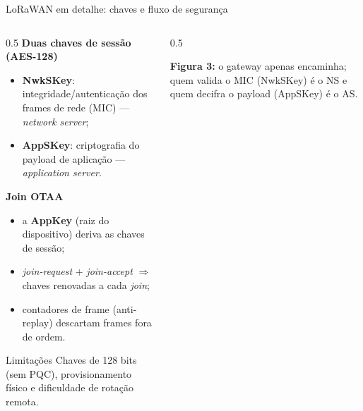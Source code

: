 \documentclass[aspectratio=169,11pt]{beamer}
\begin{document}
\begin{frame}{LoRaWAN em detalhe: chaves e fluxo de segurança}
  \begin{columns}
    \begin{column}{0.5\textwidth}
      \textbf{Duas chaves de sessão (AES-128)}
      \begin{itemize}\small
        \item \textbf{NwkSKey}: integridade/autenticação dos frames de rede (MIC) --- \emph{network server};
        \item \textbf{AppSKey}: criptografia do payload de aplicação --- \emph{application server}.
      \end{itemize}
      \textbf{Join OTAA}
      \begin{itemize}\small
        \item a \textbf{AppKey} (raiz do dispositivo) deriva as chaves de sessão;
        \item \emph{join-request} + \emph{join-accept} $\Rightarrow$ chaves renovadas a cada \emph{join};
        \item contadores de frame (anti-replay) descartam frames fora de ordem.
      \end{itemize}
      \begin{alertblock}{Limitações}
        Chaves de 128 bits (sem PQC), provisionamento físico e dificuldade de rotação remota.
      \end{alertblock}
    \end{column}
    \begin{column}{0.5\textwidth}
      \begin{center}
      \end{center}
      \vspace{1mm}
      {\scriptsize \textbf{Figura 3:} o gateway apenas encaminha; quem valida o MIC (NwkSKey) é o NS e quem decifra o payload (AppSKey) é o AS.}
    \end{column}
  \end{columns}
\end{frame}
\end{document}
